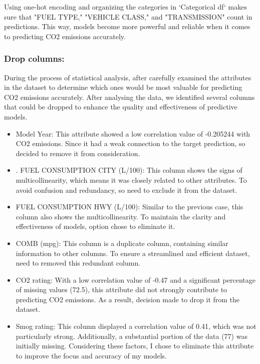 \documentclass[12pt, a4paper,oneside]{book}
\numberwithin{equation}{section}
\begin{document}
Using one-hot encoding and organizing the categories in `Categorical df` makes sure that "FUEL TYPE," "VEHICLE CLASS," and "TRANSMISSION" count in predictions. This way, models become more powerful and reliable when it comes to predicting CO2 emissions accurately.


\subsubsection{Drop columns:}

During the process of statistical analysis, after carefully examined the attributes in the dataset to determine which ones would be most valuable for predicting CO2 emissions accurately. After analysing the data, we identified several columns that could be dropped to enhance the quality and effectiveness of  predictive models.~\cite{ref21}

\begin{itemize}
    \item Model Year: This attribute showed a low correlation value of -0.205244 with CO2 emissions. Since it had a weak connection to the target prediction, so decided to remove it from consideration.
\end{itemize}

\begin{itemize}
    \item . FUEL CONSUMPTION CITY (L/100): This column shows the signs of multicollinearity, which means it was closely related to other attributes. To avoid confusion and redundancy, so need to exclude it from the dataset.
\end{itemize}

\begin{itemize}
    \item FUEL CONSUMPTION HWY (L/100): Similar to the previous case, this column also shows the multicollinearity. To maintain the clarity and effectiveness of models, option  chose to eliminate it.
\end{itemize}

\begin{itemize}
    \item COMB (mpg): This column is a duplicate column, containing similar information to other columns. To ensure a streamlined and efficient dataset, need to removed this redundant column.
\end{itemize}

\begin{itemize}
    \item CO2 rating: With a low correlation value of -0.47 and a significant percentage of missing values (72.5), this attribute did not strongly contribute to predicting CO2 emissions. As a result, decision made to drop it from the dataset.
\end{itemize}
\begin{itemize}
    \item Smog rating: This column displayed a correlation value of 0.41, which was not particularly strong. Additionally, a substantial portion of the data (77) was initially missing. Considering these factors, I chose to eliminate this attribute to improve the focus and accuracy of my models.
\end{itemize}
\end{document}
